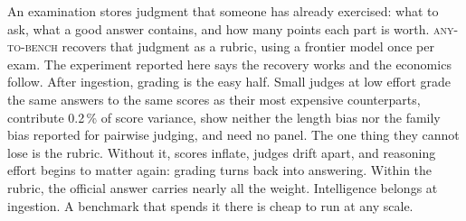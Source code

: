 \documentclass{article}
\begin{document}
An examination stores judgment that someone has already exercised: what to
ask, what a good answer contains, and how many points each part is worth.
\textsc{any-to-bench} recovers that judgment as a rubric, using a frontier
model once per exam. The experiment reported here says the recovery works and
the economics follow. After ingestion, grading is the easy half. Small judges
at low effort grade the same answers to the same scores as their most
expensive counterparts, contribute 0.2\,\% of score variance, show neither
the length bias nor the family bias reported for pairwise judging, and need
no panel. The one thing they cannot lose is the rubric. Without it, scores
inflate, judges drift apart, and reasoning effort begins to matter again:
grading turns back into answering. Within the rubric, the official answer
carries nearly all the weight. Intelligence belongs at ingestion. A
benchmark that spends it there is cheap to run at any scale.
\end{document}
